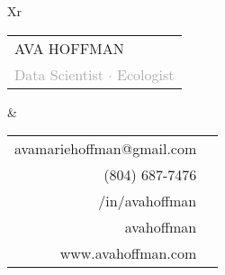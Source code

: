 \documentclass[fontsize=10pt]{scrlttr2}
\begin{document}

\begin{tabularx}{\textwidth}{Xr}
    \begin{tabular}{l}
        \Huge AVA HOFFMAN \\
        \large \textcolor{darkgray}{Data Scientist $\cdot$ Ecologist} \\
    \end{tabular}
    & 
    \begin{tabular}{rc}
        \footnotesize avamariehoffman@gmail.com & {\faEnvelopeO} \\
        \footnotesize (804) 687-7476 & {\faMobile} \\
        \footnotesize /in/avahoffman & {\faLinkedin} \\
        \footnotesize avahoffman & {\faGithub} \\
        \footnotesize www.avahoffman.com & {\faGlobe} \\
    \end{tabular}
\end{tabularx}
\vspace{0.5cm}
\end{document}

